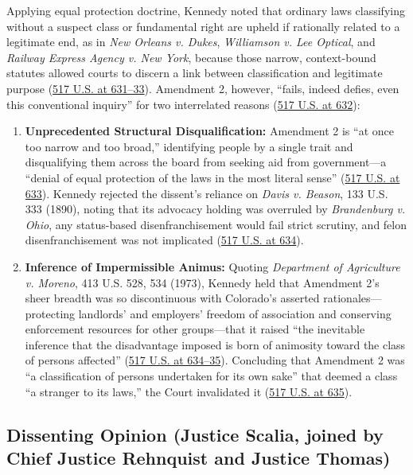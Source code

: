 \documentclass[12pt]{article}
\begin{document}
Applying equal protection doctrine, Kennedy noted that ordinary laws classifying without a suspect class or fundamental right are upheld if rationally related to a legitimate end, as in \textit{New Orleans v. Dukes}, \textit{Williamson v. Lee Optical}, and \textit{Railway Express Agency v. New York}, because those narrow, context-bound statutes allowed courts to discern a link between classification and legitimate purpose (\href{https://supreme.justia.com/cases/federal/us/517/620/}{517 U.S. at 631--33}). Amendment 2, however, ``fails, indeed defies, even this conventional inquiry'' for two interrelated reasons (\href{https://supreme.justia.com/cases/federal/us/517/620/}{517 U.S. at 632}):
\begin{enumerate}
\item \textbf{Unprecedented Structural Disqualification:} Amendment 2 is ``at once too narrow and too broad,'' identifying people by a single trait and disqualifying them across the board from seeking aid from government---a ``denial of equal protection of the laws in the most literal sense'' (\href{https://supreme.justia.com/cases/federal/us/517/620/}{517 U.S. at 633}). Kennedy rejected the dissent's reliance on \textit{Davis v. Beason}, 133 U.S. 333 (1890), noting that its advocacy holding was overruled by \textit{Brandenburg v. Ohio}, any status-based disenfranchisement would fail strict scrutiny, and felon disenfranchisement was not implicated (\href{https://supreme.justia.com/cases/federal/us/517/620/}{517 U.S. at 634}).
\item \textbf{Inference of Impermissible Animus:} Quoting \textit{Department of Agriculture v. Moreno}, 413 U.S. 528, 534 (1973), Kennedy held that Amendment 2's sheer breadth was so discontinuous with Colorado's asserted rationales---protecting landlords' and employers' freedom of association and conserving enforcement resources for other groups---that it raised ``the inevitable inference that the disadvantage imposed is born of animosity toward the class of persons affected'' (\href{https://supreme.justia.com/cases/federal/us/517/620/}{517 U.S. at 634--35}). Concluding that Amendment 2 was ``a classification of persons undertaken for its own sake'' that deemed a class ``a stranger to its laws,'' the Court invalidated it (\href{https://supreme.justia.com/cases/federal/us/517/620/}{517 U.S. at 635}).
\end{enumerate}

\subsection{Dissenting Opinion (Justice Scalia, joined by Chief Justice Rehnquist and Justice Thomas)}
\end{document}
